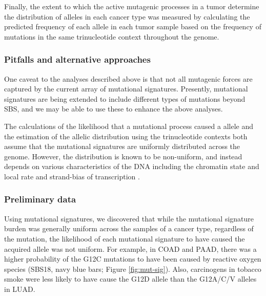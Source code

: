 Finally, the extent to which the active mutagenic processes in a tumor determine the distribution of \KRAS{} alleles in each cancer type was measured by calculating the predicted frequency of each allele in each tumor sample based on the frequency of mutations in the same trinucleotide context throughout the genome.


\subsubsection*{Pitfalls and alternative approaches}

One caveat to the analyses described above is that not all mutagenic forces are captured by the current array of mutational signatures.
Presently, mutational signatures are being extended to include different types of mutations beyond SBS, and we may be able to use these to enhance the above analyses.

The calculations of the likelihood that a mutational process caused a \KRAS{} allele and the estimation of the allelic distribution using the trinucleotide contexts both assume that the mutational signatures are uniformly distributed across the genome.
However, the distribution is known to be non-uniform, and instead depends on various characteristics of the DNA including the chromatin state \cite{Schuster-Bockler2012, Polak2015, Gonzalez-Perez2019} and local rate and strand-bias of transcription \cite{Tomkova2018MutationalAsymmetry}.


\subsubsection*{Preliminary data}

Using mutational signatures, we discovered that while the mutational signature burden was generally uniform across the samples of a cancer type, regardless of the \KRAS{} mutation, the likelihood of each mutational signature to have caused the acquired allele was not uniform.
For example, in COAD and PAAD, there was a higher probability of the \KRAS{} G12C mutations to have been caused by reactive oxygen species (SBS18, navy blue bars; Figure \ref{fig:mut-sig}).
Also, carcinogens in tobacco smoke were less likely to have cause the G12D allele than the G12A/C/V alleles in LUAD.

